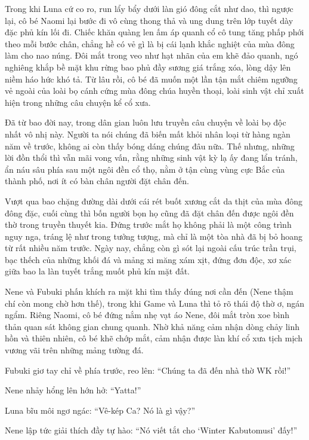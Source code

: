 \documentclass[../main.tex]{subfiles}
\begin{document}
Trong khi Luna cứ co ro, run lẩy bẩy dưới làn gió đông cắt như dao, thì ngược lại, cô bé Naomi lại bước đi vô cùng thong thả và ung dung trên lớp tuyết dày đặc phủ kín lối đi. Chiếc khăn quàng len ấm áp quanh cổ cô tung tăng phấp phới theo mỗi bước chân, chẳng hề có vẻ gì là bị cái lạnh khắc nghiệt của mùa đông làm cho nao núng. Đôi mắt trong veo như hạt nhãn của em khẽ đảo quanh, ngó nghiêng khắp bề mặt khu rừng bao phủ đầy sương giá trắng xóa, lòng dậy lên niềm háo hức khó tả. Từ lâu rồi, cô bé đã muốn một lần tận mắt chiêm ngưỡng vẻ ngoài của loài bọ cánh cứng mùa đông chúa huyền thoại, loài sinh vật chỉ xuất hiện trong những câu chuyện kể cổ xưa.

Đã từ bao đời nay, trong dân gian luôn lưu truyền câu chuyện về loài bọ độc nhất vô nhị này. Người ta nói chúng đã biến mất khỏi nhân loại từ hàng ngàn năm về trước, không ai còn thấy bóng dáng chúng đâu nữa. Thế nhưng, những lời đồn thổi thì vẫn mãi vong vấn, rằng những sinh vật kỳ lạ ấy đang lẩn tránh, ẩn náu sâu phía sau một ngôi đền cổ thọ, nằm ở tận cùng vùng cực Bắc của thành phố, nơi ít có bàn chân người đặt chân đến.

Vượt qua bao chặng đường dài dưới cái rét buốt xương cắt da thịt của mùa đông đông đặc, cuối cùng thì bốn người bọn họ cũng đã đặt chân đến được ngôi đền thờ trong truyền thuyết kia. Đứng trước mắt họ không phải là một công trình nguy nga, tráng lệ như trong tưởng tượng, mà chỉ là một tòa nhà đã bị bỏ hoang từ rất nhiều năm trước. Ngày nay, chẳng còn gì sót lại ngoài cấu trúc trần trụi, bạc thếch của những khối đá và mảng xi măng xám xịt, đứng đơn độc, xơ xác giữa bao la làn tuyết trắng muốt phủ kín mặt đất.


Nene và Fubuki phấn khích ra mặt khi tìm thấy đúng nơi cần đến (Nene thậm chí còn mong chờ hơn thế), trong khi Game và Luna thì tỏ rõ thái độ thờ ơ, ngán ngẩm. Riêng Naomi, cô bé đứng nắm nhẹ vạt áo Nene, đôi mắt tròn xoe bình thản quan sát không gian chung quanh. Nhờ khả năng cảm nhận dòng chảy linh hồn và thiên nhiên, cô bé khẽ chớp mắt, cảm nhận được làn khí cổ xưa tịch mịch vương vãi trên những mảng tường đá.

Fubuki giơ tay chỉ về phía trước, reo lên: ``Chúng ta đã đến nhà thờ WK rồi!''

Nene nhảy hổng lên hớn hở: ``Yatta!''

Luna bĩu môi ngơ ngác: ``Vê-kép Ca? Nó là gì vậy?''

Nene lập tức giải thích đầy tự hào: ``Nó viết tắt cho `Winter Kabutomusi' đấy!''
\end{document}
